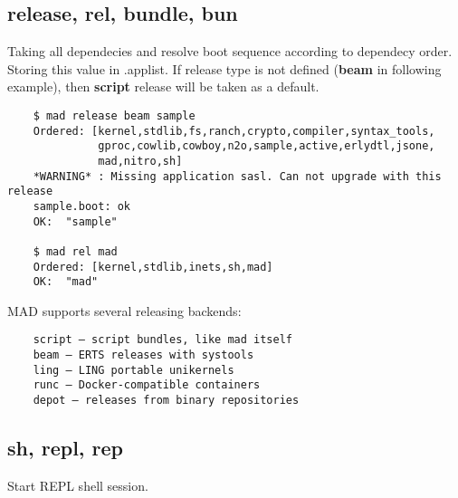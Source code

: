 \subsection{release, rel, bundle, bun}
Taking all dependecies and resolve boot sequence according to dependecy order.
Storing this value in .applist. If release type is not defined ({\bf beam} in following example),
then {\bf script} release will be taken as a default.
\vspace{1\baselineskip}
\begin{lstlisting}
    $ mad release beam sample
    Ordered: [kernel,stdlib,fs,ranch,crypto,compiler,syntax_tools,
              gproc,cowlib,cowboy,n2o,sample,active,erlydtl,jsone,
              mad,nitro,sh]
    *WARNING* : Missing application sasl. Can not upgrade with this release
    sample.boot: ok
    OK:  "sample"

    $ mad rel mad
    Ordered: [kernel,stdlib,inets,sh,mad]
    OK:  "mad"
\end{lstlisting}
\vspace{1\baselineskip}

MAD supports several releasing backends:

\vspace{1\baselineskip}
\begin{lstlisting}
    script — script bundles, like mad itself
    beam — ERTS releases with systools
    ling — LING portable unikernels
    runc — Docker-compatible containers
    depot — releases from binary repositories
\end{lstlisting}
\vspace{1\baselineskip}

\subsection{sh, repl, rep}

Start REPL shell session.
